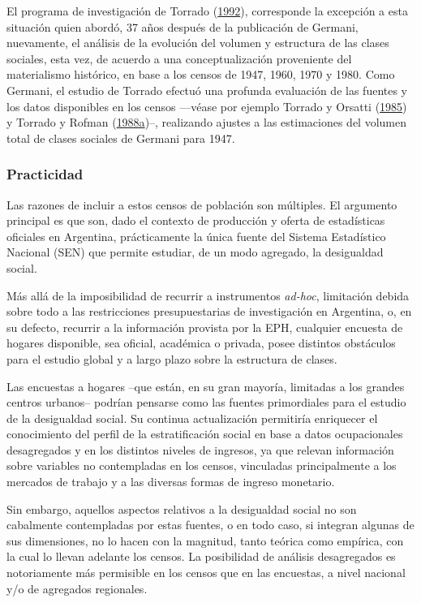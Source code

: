 \documentclass[
]{article}
\begin{document}
El programa de investigación de Torrado (\protect\hyperlink{ref-Torrado1992}{1992}), corresponde la excepción a esta situación quien abordó, 37 años después de la publicación de Germani, nuevamente, el análisis de la evolución del volumen y estructura de las clases sociales, esta vez, de acuerdo a una conceptualización proveniente del materialismo histórico, en base a los censos de 1947, 1960, 1970 y 1980. Como Germani, el estudio de Torrado efectuó una profunda evaluación de las fuentes y los datos disponibles en los censos ---véase por ejemplo Torrado y Orsatti (\protect\hyperlink{ref-Torrado1985}{1985}) y Torrado y Rofman (\protect\hyperlink{ref-Torrado1988}{1988a})--, realizando ajustes a las estimaciones del volumen total de clases sociales de Germani para 1947.

\hypertarget{practicidad}{%
\subsubsection{Practicidad}\label{practicidad}}

Las razones de incluir a estos censos de población son múltiples. El argumento principal es que son, dado el contexto de producción y oferta de estadísticas oficiales en Argentina, prácticamente la única fuente del Sistema Estadístico Nacional (SEN) que permite estudiar, de un modo agregado, la desigualdad social.

Más allá de la imposibilidad de recurrir a instrumentos \emph{ad-hoc}, limitación debida sobre todo a las restricciones presupuestarias de investigación en Argentina, o, en su defecto, recurrir a la información provista por la EPH, cualquier encuesta de hogares disponible, sea oficial, académica o privada, posee distintos obstáculos para el estudio global y a largo plazo sobre la estructura de clases.

Las encuestas a hogares --que están, en su gran mayoría, limitadas a los grandes centros urbanos-- podrían pensarse como las fuentes primordiales para el estudio de la desigualdad social. Su continua actualización permitiría enriquecer el conocimiento del perfil de la estratificación social en base a datos ocupacionales desagregados y en los distintos niveles de ingresos, ya que relevan información sobre variables no contempladas en los censos, vinculadas principalmente a los mercados de trabajo y a las diversas formas de ingreso monetario.

Sin embargo, aquellos aspectos relativos a la desigualdad social no son cabalmente contempladas por estas fuentes, o en todo caso, si integran algunas de sus dimensiones, no lo hacen con la magnitud, tanto teórica como empírica, con la cual lo llevan adelante los censos. La posibilidad de análisis desagregados es notoriamente más permisible en los censos que en las encuestas, a nivel nacional y/o de agregados regionales.
\end{document}
